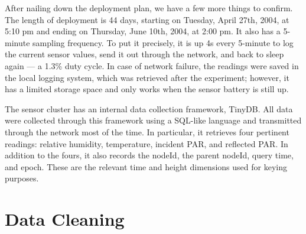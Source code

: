 \documentclass[11pt, letterpaper]{article}
\begin{document}
After nailing down the deployment plan, we have a few more things to confirm. The length of deployment is 44 days, starting on Tuesday, April 27th, 2004, at 5:10 pm and ending on Thursday, June 10th, 2004, at 2:00 pm. It also has a 5-minute sampling frequency. To put it precisely, it is up 4s every 5-minute to log the current sensor values, send it out through the network, and back to sleep again --- a 1.3\% duty cycle. In case of network failure, the readings were saved in the local logging system, which was retrieved after the experiment; however, it has a limited storage space and only works when the sensor battery is still up. 

The sensor cluster has an internal data collection framework, TinyDB. All data were collected through this framework using a SQL-like language and transmitted through the network most of the time. In particular, it retrieves four pertinent readings: relative humidity, temperature, incident PAR, and reflected PAR. In addition to the fours, it also records the nodeId, the parent nodeId, query time, and epoch. These are the relevant time and height dimensions used for keying purposes. 


\section{Data Cleaning}
\end{document}
